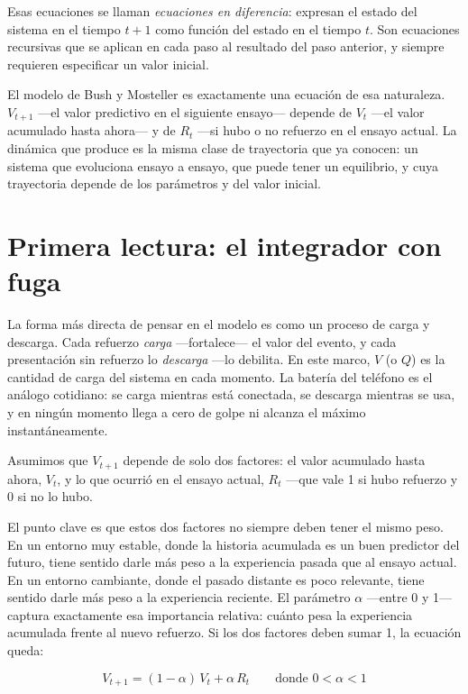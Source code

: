\documentclass[
  letterpaper,
  DIV=11,
  numbers=noendperiod]{scrreprt}
\begin{document}
\begin{tcolorbox}[enhanced jigsaw, toprule=.15mm, arc=.35mm, colback=white, opacityback=0, colframe=quarto-callout-note-color-frame, breakable, rightrule=.15mm, left=2mm, leftrule=.75mm, bottomrule=.15mm]
Esas ecuaciones se llaman \emph{ecuaciones en diferencia}: expresan el
estado del sistema en el tiempo \(t+1\) como función del estado en el
tiempo \(t\). Son ecuaciones recursivas que se aplican en cada paso al
resultado del paso anterior, y siempre requieren especificar un valor
inicial.

El modelo de Bush y Mosteller es exactamente una ecuación de esa
naturaleza. \(V_{t+1}\) ---el valor predictivo en el siguiente ensayo---
depende de \(V_t\) ---el valor acumulado hasta ahora--- y de \(R_t\)
---si hubo o no refuerzo en el ensayo actual. La dinámica que produce es
la misma clase de trayectoria que ya conocen: un sistema que evoluciona
ensayo a ensayo, que puede tener un equilibrio, y cuya trayectoria
depende de los parámetros y del valor inicial.

\section{Primera lectura: el integrador con
fuga}\label{primera-lectura-el-integrador-con-fuga}

La forma más directa de pensar en el modelo es como un proceso de carga
y descarga. Cada refuerzo \emph{carga} ---fortalece--- el valor del
evento, y cada presentación sin refuerzo lo \emph{descarga} ---lo
debilita. En este marco, \(V\) (o \(Q\)) es la cantidad de carga del
sistema en cada momento. La batería del teléfono es el análogo
cotidiano: se carga mientras está conectada, se descarga mientras se
usa, y en ningún momento llega a cero de golpe ni alcanza el máximo
instantáneamente.

Asumimos que \(V_{t+1}\) depende de solo dos factores: el valor
acumulado hasta ahora, \(V_t\), y lo que ocurrió en el ensayo actual,
\(R_t\) ---que vale 1 si hubo refuerzo y 0 si no lo hubo.

El punto clave es que estos dos factores no siempre deben tener el mismo
peso. En un entorno muy estable, donde la historia acumulada es un buen
predictor del futuro, tiene sentido darle más peso a la experiencia
pasada que al ensayo actual. En un entorno cambiante, donde el pasado
distante es poco relevante, tiene sentido darle más peso a la
experiencia reciente. El parámetro \(\alpha\) ---entre 0 y 1--- captura
exactamente esa importancia relativa: cuánto pesa la experiencia
acumulada frente al nuevo refuerzo. Si los dos factores deben sumar 1,
la ecuación queda:

\[V_{t+1} = (1-\alpha)\,V_t + \alpha\,R_t \qquad \text{donde } 0 < \alpha < 1\]


\end{tcolorbox}
\end{document}
